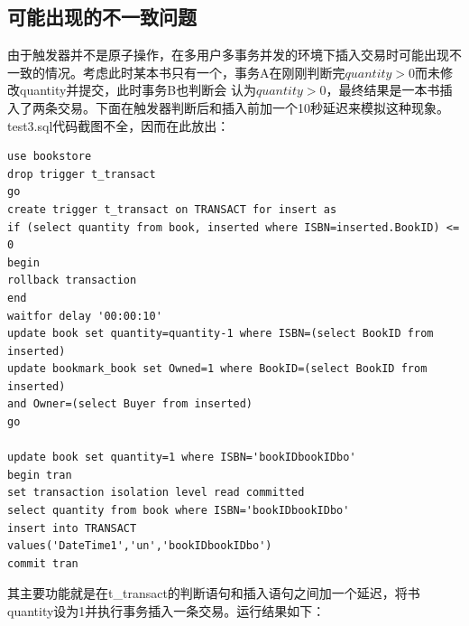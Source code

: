 \documentclass[UTF8, a4paper, 11pt]{article}
\begin{document}
\subsection{可能出现的不一致问题}
由于触发器并不是原子操作，在多用户多事务并发的环境下插入交易时可能出现不一致的情况。考虑此时某本书只有一个，事务A在刚刚判断完$quantity>0$而未修改quantity并提交，此时事务B也判断会
认为$quantity>0$，最终结果是一本书插入了两条交易。下面在触发器判断后和插入前加一个10秒延迟来模拟这种现象。test3.sql代码截图不全，因而在此放出：
\begin{lstlisting}
use bookstore
drop trigger t_transact
go
create trigger t_transact on TRANSACT for insert as
if (select quantity from book, inserted where ISBN=inserted.BookID) <= 0
begin
rollback transaction
end
waitfor delay '00:00:10'
update book set quantity=quantity-1 where ISBN=(select BookID from inserted)
update bookmark_book set Owned=1 where BookID=(select BookID from inserted)
and Owner=(select Buyer from inserted)
go

update book set quantity=1 where ISBN='bookIDbookIDbo'
begin tran
set transaction isolation level read committed
select quantity from book where ISBN='bookIDbookIDbo'
insert into TRANSACT
values('DateTime1','un','bookIDbookIDbo')
commit tran
\end{lstlisting}
其主要功能就是在t\_transact的判断语句和插入语句之间加一个延迟，将书quantity设为1并执行事务插入一条交易。运行结果如下：
\begin{figure}[H]
\end{figure}
\end{document}
